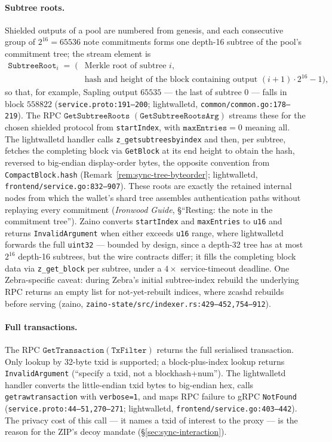 \documentclass[11pt,a4paper]{article}
\theoremstyle{definition}
\begin{document}
\paragraph{Subtree roots.} Shielded outputs of a pool are numbered from
genesis, and each consecutive group of $2^{16} = 65536$ note commitments
forms one depth-16 subtree of the pool's commitment tree; the stream
element is
\begin{align*}
\mathtt{SubtreeRoot}_i \;=\; \bigl(&\text{Merkle root of subtree } i,\\
&\text{hash and height of the block containing output }
(i+1)\cdot 2^{16} - 1\bigr),
\end{align*}
so that, for example, Sapling output $65535$ --- the last of subtree $0$
--- falls in block $558822$ (\texttt{service.proto:191--200};
\textsf{lightwalletd}, \texttt{common/common.go:178--219}). The RPC
$\mathtt{GetSubtree}$\allowbreak$\mathtt{Roots}$\allowbreak
$(\mathtt{GetSubtreeRootsArg})$
streams these for the chosen shielded protocol from \texttt{startIndex},
with
$\mathtt{maxEntries} = 0$ meaning all. The lightwalletd handler calls
\texttt{z\_getsubtreesbyindex} and then, per subtree, fetches the
completing block via \texttt{GetBlock} at its end height to obtain the
hash, reversed to big-endian display-order bytes, the opposite
convention from \texttt{CompactBlock.hash}
(Remark~\ref{rem:sync-tree-byteorder}; \textsf{lightwalletd},
\texttt{frontend/service.go:832--907}). These roots are exactly the
retained internal nodes from which the wallet's shard tree assembles
authentication paths without replaying every commitment (\emph{Ironwood
Guide}, \S``Resting: the note in the commitment tree''). Zaino converts
\texttt{startIndex} and \texttt{maxEntries} to
\texttt{u16} and returns \texttt{InvalidArgument} when either exceeds
\texttt{u16} range, where lightwalletd forwards the full \texttt{uint32}
--- bounded by design, since a depth-32 tree has at most $2^{16}$
depth-16 subtrees, but the wire contracts differ; it fills the completing
block data via \texttt{z\_get\_block} per subtree, under a $4 \times$
service-timeout deadline. One Zebra-specific caveat: during Zebra's
initial subtree-index rebuild the underlying RPC returns an empty list
for not-yet-rebuilt indices, where zcashd rebuilds before serving
(\textsf{zaino}, \texttt{zaino-state/src/indexer.rs:429--452,754--912}).

\paragraph{Full transactions.} The RPC
$\mathtt{GetTransaction}(\mathtt{TxFilter})$ returns the full serialised
transaction. Only lookup by 32-byte txid is supported; a block-plus-index
lookup returns \texttt{InvalidArgument} (``specify a txid, not a
blockhash+num''). The lightwalletd handler converts the little-endian
txid bytes to big-endian hex, calls \texttt{getrawtransaction} with
\texttt{verbose=1}, and maps RPC failure to gRPC \texttt{NotFound}
(\texttt{service.proto:44--51,270--271}; \textsf{lightwalletd},
\texttt{frontend/service.go:403--442}). The privacy cost of this call ---
it names a txid of interest to the proxy --- is the reason for the ZIP's
decoy mandate (\S\ref{sec:sync-interaction}).
\end{document}
